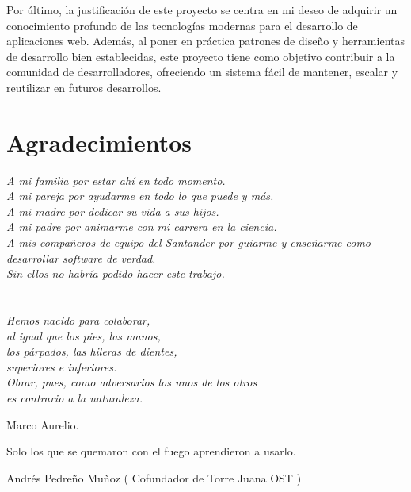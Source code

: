 \documentclass[draft]{scrbook}
\begin{document}
Por último, la justificación de este proyecto se centra en mi deseo de adquirir un conocimiento profundo de las tecnologías modernas para el desarrollo de aplicaciones web. Además, al poner en práctica patrones de diseño y herramientas de desarrollo bien establecidas, este proyecto tiene como objetivo contribuir a la comunidad de desarrolladores, ofreciendo un sistema fácil de mantener, escalar y reutilizar en futuros desarrollos.


\cleardoublepage %
\chapter*{Agradecimientos}
\setlength{\leftmargin}{0.5\textwidth}
\setlength{\parsep}{0cm}
\addtolength{\topsep}{0.5cm}

\begin{flushright}
\small\em{
A mi familia por estar ahí en todo momento.\\
A mi pareja por ayudarme en todo lo que puede y más.\\
A mi madre por dedicar su vida a sus hijos.\\
A mi padre por animarme con mi carrera en la ciencia.\\
A mis compañeros de equipo del Santander por guiarme y enseñarme como desarrollar software de verdad. \\
Sin ellos no habría podido hacer este trabajo.
}
\end{flushright}



\cleardoublepage %
\chapter*{}
\setlength{\leftmargin}{0.5\textwidth}
\setlength{\parsep}{0cm}
\addtolength{\topsep}{0.5cm}
\begin{flushright}
\small\em{
Hemos nacido para colaborar,\\
al igual que los pies, las manos,\\
los párpados, las hileras de dientes,\\
superiores e inferiores. \\
Obrar, pues, como adversarios los unos de los otros\\
es contrario a la naturaleza.
}
\end{flushright}
\begin{flushright}
\small{
Marco Aurelio.
}
\end{flushright}
\begin{flushright}
\small\em{
Solo los que se quemaron con el fuego aprendieron a usarlo.

}
\end{flushright}
\begin{flushright}
\small{
Andrés Pedreño Muñoz ( Cofundador de Torre Juana OST )
}
\end{flushright}
\cleardoublepage %
\end{document}
